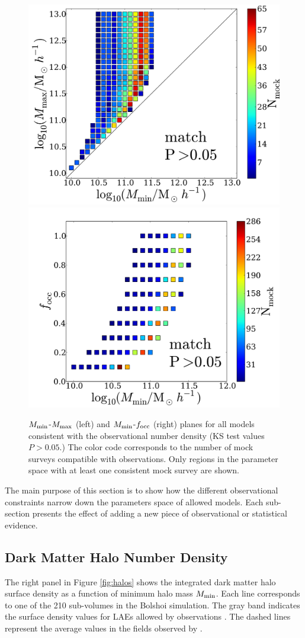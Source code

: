 \documentclass[usenatbib]{mn2e}
\begin{document}
\begin{figure}
\begin{center}
\includegraphics[width=0.46\linewidth,angle=0]{Fig2_match_P5.pdf}
\vspace{5mm}
\includegraphics[width=0.49\linewidth,angle=0]{Fig3_match_P5.pdf}
\end{center} 
\caption{$M_{\rm min}$-$M_{\rm max}$ (left) and $M_{\rm    min}$-$f_{\rm
    occ}$ (right) planes for all models consistent with the
  observational number density (KS test values
  $P>0.05$.) The color code corresponds to the number of mock surveys
  compatible with observations. Only regions in the parameter space
  with at least one consistent mock survey are
  shown. \label{fig:landscape}}      
\end{figure} 

The main purpose of this section is to show how the different
observational constraints narrow down the parameters space of allowed
models. Each sub-section presents the effect of adding a new piece of 
observational or statistical evidence. 


\subsection{Dark Matter Halo Number Density}

The right panel in Figure \ref{fig:halos} shows the  integrated dark matter halo surface
density as a function of  minimum halo mass $M_{\rm min}$. Each line
corresponds to one of the 210 sub-volumes in the Bolshoi
simulation. The gray band indicates the surface density values for
LAEs allowed by observations \citep{Yamada2012}. The dashed lines
represent the average values in the fields observed by
\citep{Ouchi2008}. 
 
\end{document}
